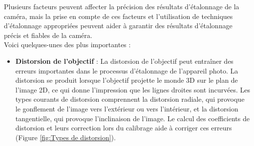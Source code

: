 \begin{itemize}[label={\Huge$\star$}]
\end{itemize}

 Plusieurs facteurs peuvent affecter la précision des résultats d’étalonnage de la caméra, mais la prise en compte de ces facteurs et l’utilisation de techniques d’étalonnage appropriées peuvent aider à garantir des résultats d’étalonnage précis et fiables de la caméra. \\
 
 Voici quelques-unes des plus importantes : 
 
 \begin{itemize}
 	\item \textbf{Distorsion de l’objectif } :  La distorsion de l’objectif peut entraîner des erreurs importantes dans le processus d’étalonnage de l’appareil photo. La distorsion se produit lorsque l’objectif projette le monde 3D sur le plan de l’image 2D, ce qui donne l’impression que les lignes droites sont incurvées. Les types courants de distorsion comprennent la distorsion radiale, qui provoque le gonflement de l’image vers l’extérieur ou vers l’intérieur, et la distorsion tangentielle, qui provoque l’inclinaison de l’image. Le calcul des coefficients de distorsion et leurs correction lors du calibrage aide à corriger ces erreurs  (Figure \ref{fig:Types de distorsion}). 
 	

\end{itemize}
